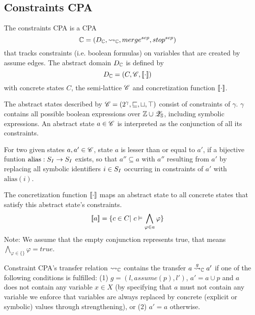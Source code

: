 \subsection{Constraints CPA}

The constraints CPA is a CPA \[\mathbb{C} = (D_{\mathbb{C}}, \rightsquigarrow_{\mathbb{C}}, merge^{sep}, stop^{sep})\] that tracks constraints (i.e. boolean formulas) on variables that are created by assume edges.
The abstract domain $D_{\mathbb{C}}$ is defined by 
\[D_{\mathbb{C}} = (C, \mathscr{C}, [\![ \cdot ]\!])\]
with concrete states $C$, the semi-lattice $\mathscr{C}$ and concretization function $[\![ \cdot ]\!]$.

The abstract states described by $\mathscr{C} = (2^\gamma, \sqsubseteq, \sqcup, \top)$ consist of constraints of $\gamma$.
$\gamma$ contains all possible boolean expressions over $\mathbb{Z} \cup \mathscr{Z}_{\mathbb{S}}$, including symbolic expressions.
An abstract state $a \in \mathscr{C}$ is interpreted as the conjunction of all its constraints.

For two given states $a, a' \in \mathscr{C}$, state $a$ is lesser than or equal to $a'$, if a bijective funtion $\text{alias}: S_I \rightarrow S_I$ exists, so that $a'' \subseteq a$ with $a''$ resulting from $a'$ by replacing all symbolic identifiers $i \in S_I$ occurring in constraints of $a'$ with $\text{alias}(i)$.

The concretization function $[\![ \cdot ]\!]$ maps an abstract state to all concrete states that satisfy this abstract state's constraints.
        \[ [\![ a ]\!] = \{ c \in C |\ c \vDash \displaystyle\bigwedge_{\varphi \in a} \varphi \} \]
        Note: We assume that the empty conjunction represents true, that means $\displaystyle\bigwedge_{\varphi \in \{\}} \varphi = true$.

Constraint CPA's transfer relation $\rightsquigarrow_{\mathbb{C}}$ contains the transfer $a \overset{g}{\rightsquigarrow}_{\mathbb{C}} a'$ if one of the following conditions is fulfilled:
(1) $g = (l, assume(p), l')$, $a' = a \cup {p}$ and $a$ does not contain any variable $x \in X$
(by specifying that $a$ must not contain any variable we enforce that variables are always replaced by concrete (explicit or symbolic) values through strengthening), or
(2) $a' = a$ otherwise.

